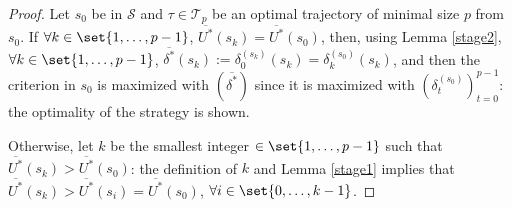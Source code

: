 \begin{proof}
Let $s_0$ be in $\mathcal{S}$ 
and $\tau \in \mathcal{T}_p$ be an optimal trajectory 
of minimal size $p$ from $s_0$. 
If $\forall k \in \set{1,\ldots,p-1}$, 
$\overline{U^*}(s_k) = \overline{U^*}(s_0)$,
then, using Lemma \ref{stage2}, $\forall k \in \set{1,\ldots,p-1}$,
$\overline{\delta^*}(s_k):=\delta^{(s_k)}_0 (s_k) = \delta^{(s_0)}_k(s_k)$,
and then the criterion in $s_0$ is maximized with $(\overline{\delta^*})$ 
since it is maximized with $(\delta_t^{(s_0)})_{t=0}^{p-1}$:
the optimality of the strategy is shown. 

Otherwise, let $ k$ be the smallest integer 
$\in \set{1,\ldots,p-1}$ such that 
$\overline{U^*}(s_k) > \overline{U^*}(s_0)$:
the definition of $k$ and Lemma \ref{stage1} implies that
$\overline{U^*}(s_k) > \overline{U^*}(s_i) = \overline{U^*}(s_0)$,
$\forall i \in \set{0, \ldots, k-1}$.


\end{proof}
